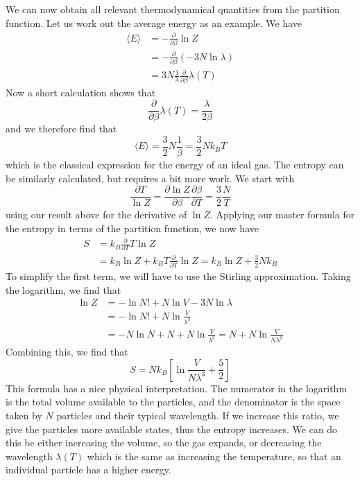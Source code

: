 \documentclass[a4paper, draft]{article}
\theoremstyle{own}
\theoremstyle{remark}
\begin{document}
We can now obtain all relevant thermodynamical quantities from the partition function. Let us work out the average energy as an example. We have
\begin{align*}
\langle E \rangle  &= - \frac{\partial}{\partial \beta} \ln Z \\
&= - \frac{\partial}{\partial \beta} (-3N \ln \lambda) \\
&= 3N \frac{1}{\lambda} \frac{\partial}{\partial \beta} \lambda(T)
\end{align*}
Now a short calculation shows that
$$
\frac{\partial}{\partial \beta} \lambda(T) = \frac{\lambda}{2\beta}
$$
and we therefore find that
$$
\langle E \rangle = \frac{3}{2} N \frac{1}{\beta} = \frac{3}{2} N k_B T
$$
which is the classical expression for the energy of an ideal gas. The entropy can be similarly calculated, but requires a bit more work. We start with
$$
\frac{\partial T}{\ln Z} = \frac{\partial \ln Z}{\partial \beta}
\frac{\partial \beta}{\partial T} = \frac{3}{2}  \frac{N}{T}
$$
using our result above for the derivative of $\ln Z$. Applying our master formula for the entropy in terms of the partition function, we now have
\begin{align*}
S &= k_B \frac{\partial }{\partial T} T \ln Z \\
&= k_B \ln Z + k_B T \frac{\partial }{\partial T} \ln Z 
= k_B \ln Z + \frac{3}{2} N k_B 
\end{align*}
To simplify the first term, we will have to use the Stirling approximation. Taking the logarithm, we find that
\begin{align*}
\ln Z  &= - \ln N! + N \ln V - 3N \ln \lambda \\
& = - \ln N! + N \ln \frac{V}{\lambda^3} \\
&= - N \ln N + N + N \ln \frac{V}{\lambda^3} = N + N \ln \frac{V}{N \lambda^3}
\end{align*}
Combining this, we find that
$$
S = N k_B \left[ \ln \frac{V}{N \lambda^3} + \frac{5}{2} \right]
$$
This formula has a nice physical interpretation. The numerator in the logarithm is the total volume available to the particles, and the denominator is the space taken by $N$ particles and their typical wavelength. If we increase this ratio, we give the particles more available states, thus the entropy increases. We can do this be either increasing the volume, so the gas expands, or decreasing the wavelength $\lambda(T)$ which is the same as increasing the temperature, so that an individual particle has a higher energy. 
\end{document}
